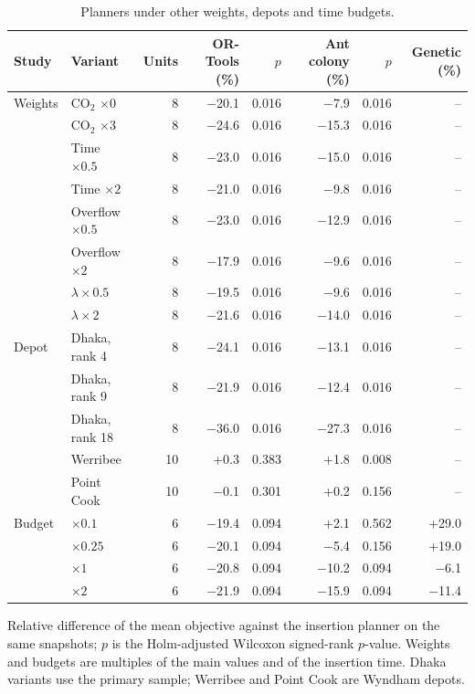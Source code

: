 \begin{table}[!htbp]
\caption{Planners under other weights, depots and time budgets.}
\label{tab:support}
\centering
\small
\setlength{\tabcolsep}{3pt}
\begin{tabular}{llrrrrrr}
\toprule
Study & Variant & Units & OR-Tools (\%) & $p$ & Ant colony (\%) & $p$ & Genetic (\%) \\
\midrule
Weights & CO$_2$ $\times 0$ & 8 & \ensuremath{-}20.1 & 0.016 & \ensuremath{-}7.9 & 0.016 & -- \\
 & CO$_2$ $\times 3$ & 8 & \ensuremath{-}24.6 & 0.016 & \ensuremath{-}15.3 & 0.016 & -- \\
 & Time $\times 0.5$ & 8 & \ensuremath{-}23.0 & 0.016 & \ensuremath{-}15.0 & 0.016 & -- \\
 & Time $\times 2$ & 8 & \ensuremath{-}21.0 & 0.016 & \ensuremath{-}9.8 & 0.016 & -- \\
 & Overflow $\times 0.5$ & 8 & \ensuremath{-}23.0 & 0.016 & \ensuremath{-}12.9 & 0.016 & -- \\
 & Overflow $\times 2$ & 8 & \ensuremath{-}17.9 & 0.016 & \ensuremath{-}9.6 & 0.016 & -- \\
 & $\lambda \times 0.5$ & 8 & \ensuremath{-}19.5 & 0.016 & \ensuremath{-}9.6 & 0.016 & -- \\
 & $\lambda \times 2$ & 8 & \ensuremath{-}21.6 & 0.016 & \ensuremath{-}14.0 & 0.016 & -- \\
\addlinespace
Depot & Dhaka, rank 4 & 8 & \ensuremath{-}24.1 & 0.016 & \ensuremath{-}13.1 & 0.016 & -- \\
 & Dhaka, rank 9 & 8 & \ensuremath{-}21.9 & 0.016 & \ensuremath{-}12.4 & 0.016 & -- \\
 & Dhaka, rank 18 & 8 & \ensuremath{-}36.0 & 0.016 & \ensuremath{-}27.3 & 0.016 & -- \\
 & Werribee & 10 & +0.3 & 0.383 & +1.8 & 0.008 & -- \\
 & Point Cook & 10 & \ensuremath{-}0.1 & 0.301 & +0.2 & 0.156 & -- \\
\addlinespace
Budget & $\times 0.1$ & 6 & \ensuremath{-}19.4 & 0.094 & +2.1 & 0.562 & +29.0 \\
 & $\times 0.25$ & 6 & \ensuremath{-}20.1 & 0.094 & \ensuremath{-}5.4 & 0.156 & +19.0 \\
 & $\times 1$ & 6 & \ensuremath{-}20.8 & 0.094 & \ensuremath{-}10.2 & 0.094 & \ensuremath{-}6.1 \\
 & $\times 2$ & 6 & \ensuremath{-}21.9 & 0.094 & \ensuremath{-}15.9 & 0.094 & \ensuremath{-}11.4 \\
\bottomrule
\end{tabular}
\par\smallskip\footnotesize Relative difference of the mean objective against the insertion planner on the same snapshots; $p$ is the Holm-adjusted Wilcoxon signed-rank $p$-value. Weights and budgets are multiples of the main values and of the insertion time. Dhaka variants use the primary sample; Werribee and Point Cook are Wyndham depots.
\end{table}
